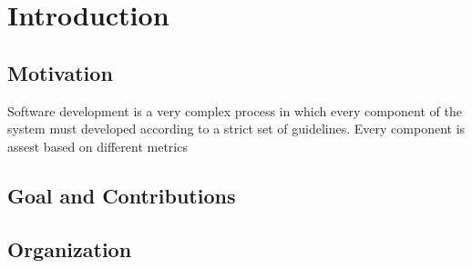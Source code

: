 \chapter{Introduction}\label{ch:1}

\section{Motivation}
	Software development is a very complex process in which every component of the
system must developed according to a strict set of guidelines. Every component
is assest based on different metrics



\section{Goal and Contributions}
	
	


\section {Organization}

	